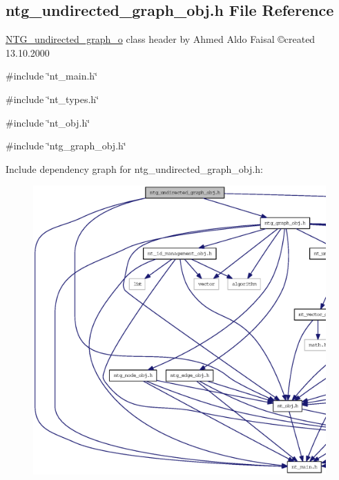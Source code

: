 \subsection{ntg\_\-undirected\_\-graph\_\-obj.h File Reference}
\label{ntg__undirected__graph__obj_8h}



\begin{DoxyItemize}
\item \hyperlink{class_n_t_g__undirected__graph__o}{NTG\_\-undirected\_\-graph\_\-o} class header by Ahmed Aldo Faisal \copyright created 13.10.2000 
\end{DoxyItemize} 


{\ttfamily \#include \char`\"{}nt\_\-main.h\char`\"{}}\par
{\ttfamily \#include \char`\"{}nt\_\-types.h\char`\"{}}\par
{\ttfamily \#include \char`\"{}nt\_\-obj.h\char`\"{}}\par
{\ttfamily \#include \char`\"{}ntg\_\-graph\_\-obj.h\char`\"{}}\par
Include dependency graph for ntg\_\-undirected\_\-graph\_\-obj.h:
\nopagebreak
\begin{figure}[H]
\begin{center}
\leavevmode
\includegraphics[width=400pt]{ntg__undirected__graph__obj_8h__incl}
\end{center}
\end{figure}
